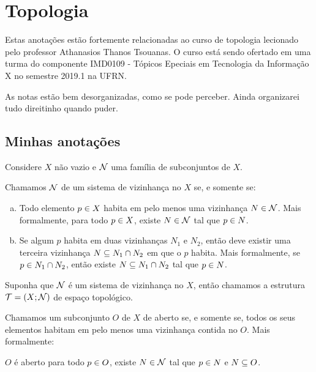 \chapter{Topologia}
Estas anotações estão fortemente relacionadas ao curso de topologia lecionado pelo professor Athanasios Thanos Tsouanas. O curso está sendo ofertado em uma turma do componente IMD0109 - Tópicos Epeciais em Tecnologia da Informação X no semestre 2019.1 na UFRN.

As notas estão bem desorganizadas, como se pode perceber. Ainda organizarei tudo direitinho quando puder.

\section{Minhas anotações}

Considere $X$ não vazio e $\mathcal{N}$ uma família de subconjuntos de $X$. 

\begin{definition}
	\label{def:sistema-de-vizinhanca}
	Chamamos $\mathcal{N}$ de um sistema de vizinhança no $X$ se, e somente se:
	\begin{enumerate}[a)]
	\item
		\label{def:sistema-de-vizinhanca1}
		Todo elemento $p \in X$ habita em pelo menos uma vizinhança $N \in \mathcal{N}$. Mais formalmente, para todo $p \in X$, existe $N \in \mathcal{N}$ tal que $p \in N$.

	\item
		\label{def:sistema-de-vizinhanca2}
		Se algum $p$ habita em duas vizinhanças $N_1$ e $N_2$, então deve existir uma terceira vizinhança $N \subseteq N_1 \cap N_2$ em que o $p$ habita. Mais formalmente, se $p \in N_1 \cap N_2$, então existe $N \subseteq N_1 \cap N_2$ tal que $p \in N$.
\end{enumerate}
\end{definition}

\begin{definition}
	Suponha que $\mathcal{N}$ é um sistema de vizinhança no $X$, então chamamos a estrutura $\mathcal{T} = (X ; \mathcal{N})$ de espaço topológico.
\end{definition}


\begin{definition}
	Chamamos um subconjunto $O$ de $X$ de aberto se, e somente se, todos os seus elementos habitam em pelo menos uma vizinhança contida no $O$. Mais formalmente:
	\begin{center}
		$O$ é aberto \sse para todo $p \in O$, existe $N \in \mathcal{N}$ tal que $p \in N$ e $N \subseteq O$.
	\end{center}
\end{definition}

